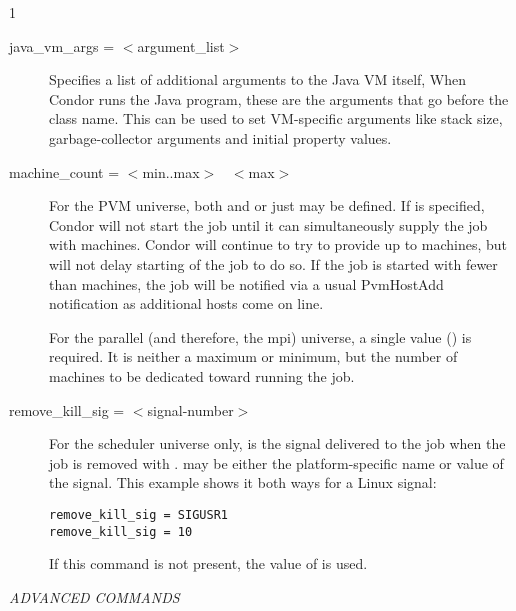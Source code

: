 \begin{ManPage}{\label{man-condor-submit}}{1}
\begin{description}
\item[java\_vm\_args = $<$argument\_list$>$]
Specifies a list of additional arguments to the Java VM itself,
When Condor runs the Java program, these are the arguments that 
go before the class name.  This can be used to set VM-specific 
arguments like stack size, garbage-collector arguments 
and initial property values.


\item[machine\_count = $<$min..max$>$ \Bar\ $<$max$>$] 
For the PVM universe,
both  and  or just
 may be defined. 
If  is
specified, Condor will not start the job until it can simultaneously
supply the job with  machines.  Condor will continue to try 
to provide up
to  machines, but will not delay starting of the job to do so.
If the job is started with fewer than  machines, the job
will be notified via a usual PvmHostAdd notification as additional
hosts come on line.

For the parallel (and therefore, the mpi) universe,
a single value () is required.
It is neither a maximum or minimum, but 
the number of machines to be dedicated toward running the job.


\item[remove\_kill\_sig = $<$signal-number$>$] For the scheduler universe only,
 is the signal delivered
to the job when the job is removed
with .
 may be either the platform-specific name or value
of the signal.
This example shows it both ways for a Linux signal:
\begin{verbatim}
remove_kill_sig = SIGUSR1
remove_kill_sig = 10
\end{verbatim}
If this command is not present,
the value of  is used.

\end{description} 

\emph{ADVANCED COMMANDS}
\begin{description} 



\end{description}
\end{ManPage}
